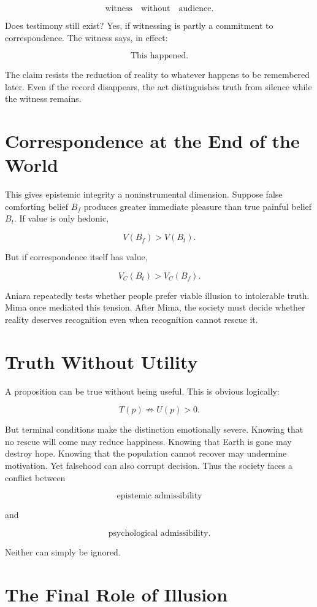 \documentclass[11pt,oneside]{book}
\theoremstyle{definition}
\theoremstyle{remark}
\begin{document}
\[
\text{witness} \quad \text{without} \quad \text{audience}.
\]

Does testimony still exist? Yes, if witnessing is partly a commitment to correspondence. The witness
says, in effect:

\[
\text{This happened.}
\]

The claim resists the reduction of reality to whatever happens to be remembered later. Even if the
record disappears, the act distinguishes truth from silence while the witness remains.

\section{Correspondence at the End of the World}

This gives epistemic integrity a noninstrumental dimension. Suppose false comforting belief \(B_f\)
produces greater immediate pleasure than true painful belief \(B_t\). If value is only hedonic,

\[
V(B_f)>V(B_t).
\]

But if correspondence itself has value,

\[
V_C(B_t)>V_C(B_f).
\]

Aniara repeatedly tests whether people prefer viable illusion to intolerable truth. Mima once
mediated this tension. After Mima, the society must decide whether reality deserves recognition even
when recognition cannot rescue it.

\section{Truth Without Utility}

A proposition can be true without being useful. This is obvious logically:

\[
T(p) \not\Rightarrow U(p)>0.
\]

But terminal conditions make the distinction emotionally severe. Knowing that no rescue will come
may reduce happiness. Knowing that Earth is gone may destroy hope. Knowing that the population
cannot recover may undermine motivation. Yet falsehood can also corrupt decision. Thus the society
faces a conflict between

\[
\text{epistemic admissibility}
\]

and

\[
\text{psychological admissibility}.
\]

Neither can simply be ignored.

\section{The Final Role of Illusion}
\end{document}
